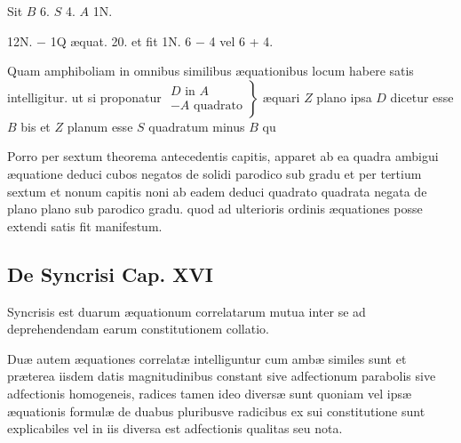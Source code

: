 \documentclass[11pt,a4paper]{article}
\begin{document}
Sit $B$ 6. $S$ 4. $A$ 1N.

12N. $-$ 1Q æquat. 20. et fit 1N. 6 $-$ 4 vel 6 + 4.

Quam amphiboliam in omnibus similibus æquationibus locum habere satis intelligitur. ut si proponatur $\left.\begin{array}{l} D \text{ in } A \\ - A \text{ quadrato} \end{array}\right\}$ æquari $Z$ plano ipsa $D$ dicetur esse $B$ bis et $Z$ planum esse $S$ quadratum minus $B$ qu

Porro per sextum theorema antecedentis capitis, apparet ab ea quadra ambigui æquatione deduci cubos negatos de solidi parodico sub gradu et per tertium sextum et nonum capitis noni ab eadem deduci quadrato quadrata negata de plano plano sub parodico gradu. quod ad ulterioris ordinis æquationes posse extendi satis fit manifestum.

\subsection*{De Syncrisi Cap. XVI}

Syncrisis est duarum æquationum correlatarum mutua inter se ad deprehendendam earum constitutionem collatio.

Duæ autem æquationes correlatæ intelliguntur cum ambæ similes sunt et præterea iisdem datis magnitudinibus constant sive adfectionum parabolis sive adfectionis homogeneis, radices tamen ideo diversæ sunt quoniam vel ipsæ æquationis formulæ de duabus pluribusve radicibus ex sui constitutione sunt explicabiles vel in iis diversa est adfectionis qualitas seu nota.
\end{document}
